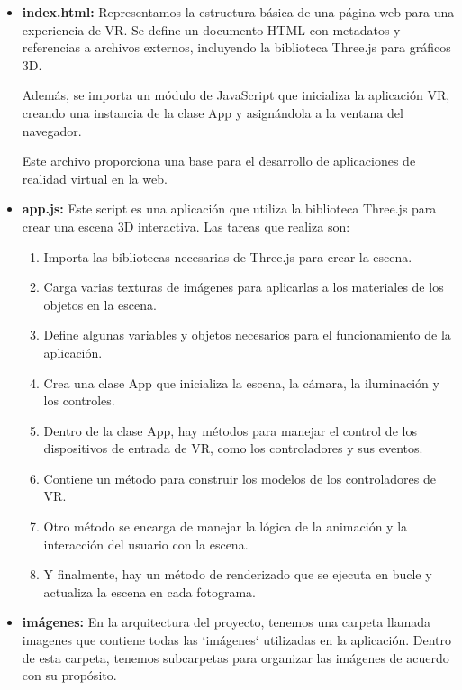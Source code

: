 \documentclass[a4paper, 12pt]{book}
\begin{document}
\begin{itemize}
  \item \textbf{index.html:} Representamos la estructura básica de una página web para una experiencia de VR. 
  Se define un documento HTML con metadatos y referencias a archivos externos, incluyendo la biblioteca Three.js para gráficos 3D. 
  
  Además, se importa un módulo de JavaScript que inicializa la aplicación VR, creando una instancia de la clase App y asignándola a la ventana del navegador. 
  
  Este archivo proporciona una base para el desarrollo de aplicaciones de realidad virtual en la web.
  
  \item \textbf{app.js:} Este script es una aplicación que utiliza la biblioteca Three.js para crear una escena 3D interactiva. Las tareas que realiza son:
    
    \begin{enumerate}
      \item Importa las bibliotecas necesarias de Three.js para crear la escena.
      \item Carga varias texturas de imágenes para aplicarlas a los materiales de los objetos en la escena.
      \item Define algunas variables y objetos necesarios para el funcionamiento de la aplicación.
      \item Crea una clase App que inicializa la escena, la cámara, la iluminación y los controles.
      \item Dentro de la clase App, hay métodos para manejar el control de los dispositivos de entrada de VR, como los controladores y sus eventos.
      \item Contiene un método para construir los modelos de los controladores de VR.
      \item Otro método se encarga de manejar la lógica de la animación y la interacción del usuario con la escena.
      \item Y finalmente, hay un método de renderizado que se ejecuta en bucle y actualiza la escena en cada fotograma.
    \end{enumerate}

  \item \textbf{imágenes:} En la arquitectura del proyecto, tenemos una carpeta llamada imagenes que contiene todas las `imágenes` utilizadas en la aplicación. 
  Dentro de esta carpeta, tenemos subcarpetas para organizar las imágenes de acuerdo con su propósito.


\end{itemize}
\end{document}

